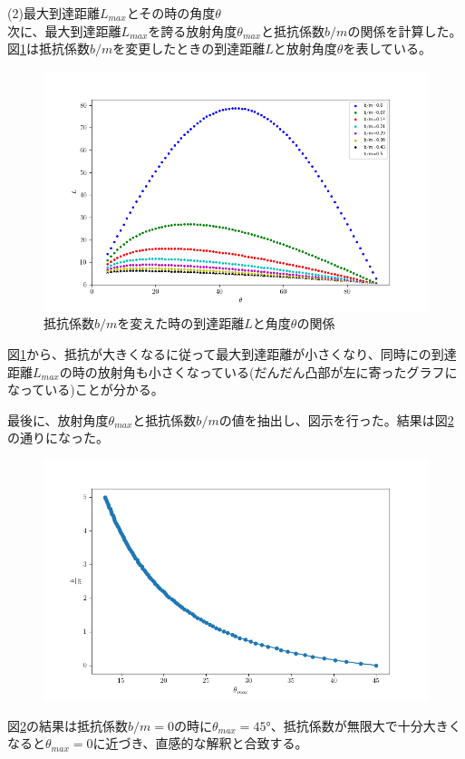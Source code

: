 \documentclass[a4j, dvipdfm]{jarticle}
\begin{document}
\begin{enumerate}[問題(1)]
        (2)最大到達距離$L_{max}$とその時の角度$\theta$ \\
        次に、最大到達距離$L_{max}$を誇る放射角度$\theta_{max}$と抵抗係数$b/m$の関係を計算した。図\ref{change_bm}は抵抗係数$b/m$を変更したときの到達距離$L$と放射角度$\theta$を表している。
        \begin{figure}[H]
          \centering
          \includegraphics[width=12cm]{pic/change_bm.png}
          \caption{抵抗係数$b/m$を変えた時の到達距離$L$と角度$\theta$の関係}
          \label{change_bm}
        \end{figure}

        図\ref{change_bm}から、抵抗が大きくなるに従って最大到達距離が小さくなり、同時にの到達距離$L_{max}$の時の放射角も小さくなっている(だんだん凸部が左に寄ったグラフになっている)ことが分かる。

        最後に、放射角度$\theta_{max}$と抵抗係数$b/m$の値を抽出し、図示を行った。結果は図\ref{theta_max}の通りになった。
        \begin{figure}[H]
          \centering
          \includegraphics[width=12cm]{pic/related_theta_bm.png}
          \caption{}
          \label{theta_max}
        \end{figure}
        図\ref{theta_max}の結果は抵抗係数$b/m=0$の時に$\theta_{max}=45$°、抵抗係数が無限大で十分大きくなると$\theta_{max}=0$に近づき、直感的な解釈と合致する。


\end{enumerate}
\end{document}
